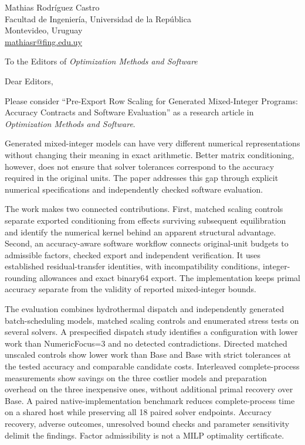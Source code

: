 \documentclass[11pt]{article}
\begin{document}
\noindent Mathias Rodr\'iguez Castro\\
Facultad de Ingenier\'ia, Universidad de la Rep\'ublica\\
Montevideo, Uruguay\\
\href{mailto:mathiasr@fing.edu.uy}{mathiasr@fing.edu.uy}

\bigskip
\noindent To the Editors of \emph{Optimization Methods and Software}

\bigskip
\noindent Dear Editors,

\medskip
Please consider ``Pre-Export Row Scaling for Generated Mixed-Integer Programs: Accuracy
Contracts and Software Evaluation'' as a research article in \emph{Optimization Methods
and Software}.

Generated mixed-integer models can have very different numerical representations
without changing their meaning in exact arithmetic. Better matrix conditioning,
however, does not ensure that solver tolerances correspond to the accuracy required
in the original units. The paper addresses this gap through explicit numerical
specifications and independently checked software evaluation.

The work makes two connected contributions. First, matched scaling controls separate
exported conditioning from effects surviving subsequent equilibration and identify
the numerical kernel behind an apparent structural advantage. Second, an accuracy-aware
software workflow connects original-unit budgets to admissible factors, checked export
and independent verification. It uses established residual-transfer identities, with
incompatibility conditions, integer-rounding allowances and exact binary64 export.
The implementation keeps primal accuracy separate from
the validity of reported mixed-integer bounds.

The evaluation combines hydrothermal dispatch and independently generated
batch-scheduling models, matched scaling controls and enumerated stress tests on
several solvers. A prespecified dispatch study identifies a configuration with lower
work than NumericFocus=3 and no detected contradictions. Directed matched unscaled
controls show lower work than Base and Base with strict tolerances at the
tested accuracy and comparable candidate costs. Interleaved complete-process
measurements show savings on the three costlier models and preparation overhead
on the three inexpensive ones, without additional primal recovery over Base.
A paired native-implementation
benchmark reduces complete-process time on a shared host while preserving all 18
paired solver endpoints. Accuracy recovery, adverse outcomes, unresolved bound checks
and parameter sensitivity delimit the findings. Factor admissibility is not a MILP
optimality certificate.
\end{document}
